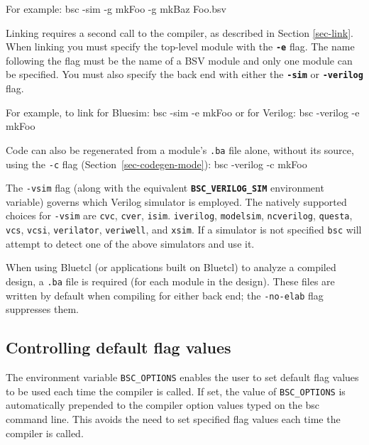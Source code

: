 \documentclass{article}
\newcommand{\te}[1]{\texttt{#1}}
\newenvironment{centerboxverbatim}
  {\center
   \boxedverbatim}
  {\endboxedverbatim
  {\endcenter }}
\begin{document}
For example:
\begin{centerboxverbatim}
bsc -sim -g mkFoo -g mkBaz Foo.bsv
\end{centerboxverbatim}

Linking requires a second call to the compiler, as described in
Section \ref{sec-link}.  When linking you must specify the
top-level module with the {\bf\tt -e} flag.  The name following the
flag must be the name of  a BSV module and only one module can be
specified.   You must also specify the back end with either the
{\bf\tt -sim}   or {\bf\tt -verilog} flag.

For example, to link for Bluesim:
\begin{centerboxverbatim}
bsc -sim -e mkFoo
\end{centerboxverbatim}
or for Verilog:
\begin{centerboxverbatim}
bsc -verilog -e mkFoo
\end{centerboxverbatim}

Code can also be regenerated from a module's \te{.ba} file alone,
without its source, using the \te{-c} flag
(Section~\ref{sec-codegen-mode}):
\begin{centerboxverbatim}
bsc -verilog -c mkFoo
\end{centerboxverbatim}


The \te{-vsim} flag
(along with the equivalent
\textbf{\texttt{BSC\_VERILOG\_SIM}} environment variable) governs which Verilog
simulator is employed.  The natively supported  choices for
\te{-vsim} are
\te{cvc},
\te{cver},
\te{isim}.
\te{iverilog},
\te{modelsim},
\te{ncverilog},
\te{questa},
\te{vcs},
\te{vcsi},
\te{verilator},
\te{veriwell},
and \te{xsim}.
If a simulator is not specified \te{bsc} will attempt to detect one
of the above simulators and use it.


When using Bluetcl (or applications built on Bluetcl) to analyze a compiled
design, a \te{.ba} file is required (for each module in the design).
These files are written by default when compiling for either back end;
the \te{-no-elab} flag suppresses them.



\subsection{Controlling default flag values}
\index{BSC\_OPTIONS@\te{BSC\_OPTIONS}}

The environment variable \te{BSC\_OPTIONS} enables the user to set
default flag values to be used each time the compiler is called.  If
set, the value of \te{BSC\_OPTIONS} is automatically  prepended to the
compiler option values  typed on the bsc command line.  This avoids
the need to set specified flag values each time the compiler is called.
\end{document}
